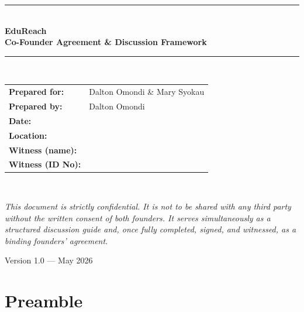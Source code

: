 \documentclass[12pt,a4paper]{article}
\newcommand{\blank}[1][5.5cm]{\underline{\hspace{#1}}}
\begin{document}
\begin{titlepage}
  \centering
  \vspace*{3cm}
  {\color{indigocolor}\rule{\linewidth}{1.5pt}}\\[1em]
  {\LARGE\bfseries EduReach}\\[0.4em]
  {\large\bfseries Co-Founder Agreement \& Discussion Framework}\\[0.8em]
  {\color{indigocolor}\rule{\linewidth}{1.5pt}}\\[2.5em]

  \begin{tabular}{@{}l l@{}}
    \textbf{Prepared for:}   & Dalton Omondi \& Mary Syokau \\[0.7em]
     \textbf{Prepared by:}   & Dalton Omondi \\[0.7em]
    \textbf{Date:}            & \blank[5cm] \\[0.7em]
    \textbf{Location:}        & \blank[5cm] \\[0.7em]
    \textbf{Witness (name):}  & \blank[5cm] \\[0.7em]
    \textbf{Witness (ID No):} & \blank[5cm] \\
  \end{tabular}\\[3em]

  \begin{mdframed}[linecolor=noteborder, backgroundcolor=notebg,
      innerleftmargin=14pt, innerrightmargin=14pt,
      innertopmargin=10pt, innerbottommargin=10pt]
    \textit{This document is strictly confidential. It is not to be shared
    with any third party without the written consent of both founders.
    It serves simultaneously as a structured discussion guide and,
    once fully completed, signed, and witnessed, as a binding founders'
    agreement.}
  \end{mdframed}

  \vfill
  {\small Version 1.0 \quad --- \quad May 2026}
\end{titlepage}

\tableofcontents
\newpage

\section*{Preamble}
\end{document}
